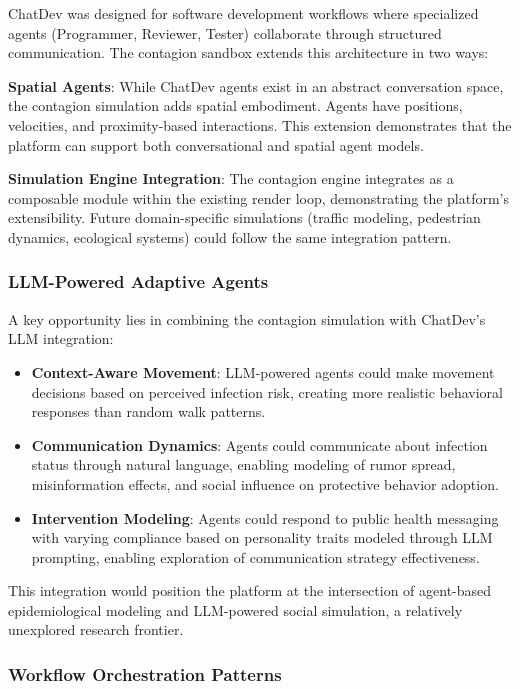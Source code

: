 ChatDev was designed for software development workflows where specialized agents (Programmer, Reviewer, Tester) collaborate through structured communication. The contagion sandbox extends this architecture in two ways:

\textbf{Spatial Agents}: While ChatDev agents exist in an abstract conversation space, the contagion simulation adds spatial embodiment. Agents have positions, velocities, and proximity-based interactions. This extension demonstrates that the platform can support both conversational and spatial agent models.

\textbf{Simulation Engine Integration}: The contagion engine integrates as a composable module within the existing render loop, demonstrating the platform's extensibility. Future domain-specific simulations (traffic modeling, pedestrian dynamics, ecological systems) could follow the same integration pattern.

\subsubsection{LLM-Powered Adaptive Agents}

A key opportunity lies in combining the contagion simulation with ChatDev's LLM integration:

\begin{itemize}
    \item \textbf{Context-Aware Movement}: LLM-powered agents could make movement decisions based on perceived infection risk, creating more realistic behavioral responses than random walk patterns.
    
    \item \textbf{Communication Dynamics}: Agents could communicate about infection status through natural language, enabling modeling of rumor spread, misinformation effects, and social influence on protective behavior adoption.
    
    \item \textbf{Intervention Modeling}: Agents could respond to public health messaging with varying compliance based on personality traits modeled through LLM prompting, enabling exploration of communication strategy effectiveness.
\end{itemize}

This integration would position the platform at the intersection of agent-based epidemiological modeling and LLM-powered social simulation, a relatively unexplored research frontier.

\subsubsection{Workflow Orchestration Patterns}

